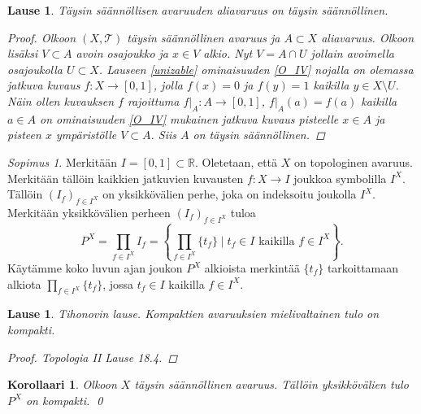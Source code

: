\documentclass[12pt,a4paper,leqno]{report}
\newcommand{\R}{\mathbb{R}}
\newcommand{\T}{\mathcal{T}}
\theoremstyle{plain}
\newtheorem{lause}[equation]{Lause}
\newtheorem{kor}[equation]{Korollaari}
\theoremstyle{definition}
\theoremstyle{remark}
\newtheorem{sopimus}[equation]{Sopimus}
\begin{document}
\begin{lause}
Täysin säännöllisen avaruuden aliavaruus on täysin säännöllinen.
\begin{proof}
Olkoon $(X,\T)$ täysin säännöllinen avaruus ja $A\subset X$ aliavaruus. 
Olkoon lisäksi $V\subset A$ avoin osajoukko ja $x\in V$ alkio. 
Nyt $V=A\cap U$ jollain avoimella osajoukolla $U\subset X$. 
Lauseen \ref{unizable} ominaisuuden \ref{O_IV} nojalla on olemassa 
jatkuva kuvaus $f\colon X\rightarrow [0,1]$, jolla $f(x)=0$ ja $ f(y)=1$ kaikilla $y\in X\setminus U$. 
Näin ollen kuvauksen $f$ rajoittuma 
$f\vert_A\colon A\rightarrow [0,1]$, $f\vert_A(a)= f(a)$ 
kaikilla $a\in A$ on ominaisuuden \ref{O_IV} mukainen jatkuva kuvaus 
pisteelle $x\in A$ ja pisteen $x$ ympäristölle $V\subset A$. 
Siis $A$ on täysin säännöllinen. 
\end{proof}
\end{lause}

\begin{sopimus}
Merkitään $I=[0,1]\subset\R$. 
Oletetaan, että $X$ on topologinen avaruus. 
Merkitään tällöin kaikkien jatkuvien 
kuvausten $f\colon X\rightarrow I$ joukkoa symbolilla $I^X$. 
Tällöin $(I_f)_{f\in I^X}$ on yksikkövälien perhe, 
joka on indeksoitu joukolla $I^X$. 
Merkitään yksikkövälien perheen $(I_f)_{f\in I^X}$ tuloa 
$$P^X=\prod_{f\in I^X}I_f
=\left\{\prod_{f\in I^X}\{t_f\}\mid t_f\in I \text{ kaikilla } f\in I^X\right\}
.$$
Käytämme koko luvun ajan joukon $P^X$ alkioista merkintää $\{t_f\}$ tarkoittamaan alkiota $\prod_{f\in I^X}\{t_f\}$, jossa $t_f\in I$ kaikilla $f\in I^X$.
\end{sopimus}

\begin{lause}
\emph{Tihonovin lause.} Kompaktien avaruuksien mielivaltainen tulo on kompakti.
\begin{proof}
Topologia II \cite{Topo2} Lause 18.4.
\end{proof}
\end{lause}

\begin{kor}
Olkoon $X$ täysin säännöllinen avaruus. 
Tällöin yksikkövälien tulo $P^X$ on kompakti.
\qed
\end{kor}
\end{document}
